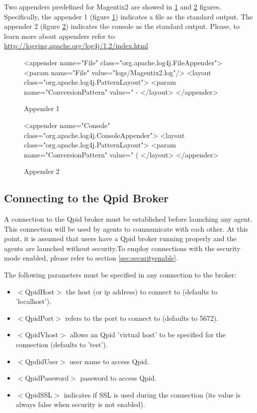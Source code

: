 Two appenders predefined for Magentix2 are showed in \ref{fig:Appender1} and \ref{fig:Appender2} figures. Specifically, the appender 1 (figure \ref{fig:Appender1}) indicates a file as the standard output. The appender 2 (figure \ref{fig:Appender2}) indicates the console as the standard output. Please, to learn more about appenders refer to: \url{http://logging.apache.org/log4j/1.2/index.html}


\begin{figure}
\begin{codigo}
<appender name="File" class="org.apache.log4j.FileAppender">
	<param name="File" value="logs/Magentix2.log"/>
	<layout class="org.apache.log4j.PatternLayout">
	    <param name="ConversionPattern" value="%
		   - %
	</layout>
</appender>
\end{codigo}
\caption{Appender 1}
\label{fig:Appender1}
\end{figure}


\begin{figure}
\begin{codigo}
<appender name="Console" class="org.apache.log4j.ConsoleAppender">
	<layout class="org.apache.log4j.PatternLayout">
	<param name="ConversionPattern" value="%
		(%
	</layout>
</appender>
\end{codigo}
\caption{Appender 2}
\label{fig:Appender2}
\end{figure}




\subsection{Connecting to the Qpid Broker}
\label{subsec:connecting}
A connection to the Qpid broker must be established before launching any agent. This connection will be used by agents to communicate with each other. At this point, it is  assumed that users have a Qpid broker running properly and the agents are launched without security.To employ connections with the security mode enabled, please refer to section \ref{sec:securityenable}.

The following parameters must be specified in any connection to the broker:

\begin{itemize}
\item$<$QpidHost$>$ the host (or ip address) to connect to (defaults to 'localhost').
\item$<$QpidPort$>$ refers to the port to connect to (defaults to 5672).
\item$<$QpidVhost$>$ allows an Qpid 'virtual host' to be specified for the connection (defaults to 'test').
\item$<$QpdidUser$>$ user name to access Qpid.
\item$<$QpidPassword$>$  password to access Qpid.
\item$<$QpidSSL$>$ indicates if  SSL is used during the connection (its value is always false when security is not enabled).
\end{itemize}

